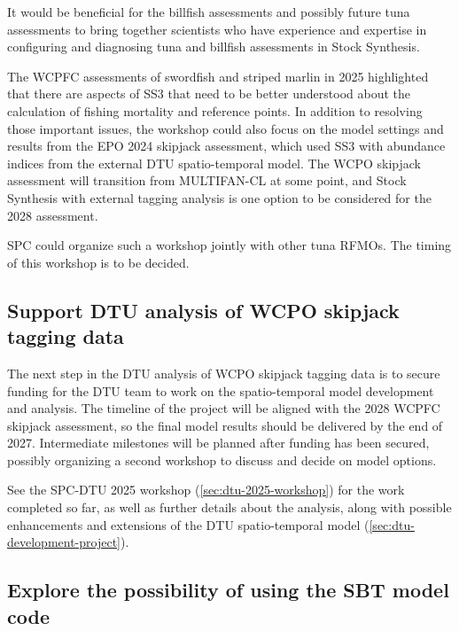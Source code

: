 \documentclass{SCreport}
\begin{document}
It would be beneficial for the billfish assessments and possibly future tuna
assessments to bring together scientists who have experience and expertise in
configuring and diagnosing tuna and billfish assessments in Stock Synthesis.

The WCPFC assessments of swordfish and striped marlin in 2025 highlighted that
there are aspects of SS3 that need to be better understood about the calculation
of fishing mortality and reference points. In addition to resolving those
important issues, the workshop could also focus on the model settings and
results from the EPO 2024 skipjack assessment, which used SS3 with abundance
indices from the external DTU spatio-temporal model. The WCPO skipjack
assessment will transition from MULTIFAN-CL at some point, and Stock Synthesis
with external tagging analysis is one option to be considered for the 2028
assessment.

SPC could organize such a workshop jointly with other tuna RFMOs. The timing of
this workshop is to be decided.

\vspace{2ex}

\subsection{Support DTU analysis of WCPO skipjack tagging data}
\label{sec:dtu-support-tagging}

The next step in the DTU analysis of WCPO skipjack tagging data is to secure
funding for the DTU team to work on the spatio-temporal model development and
analysis. The timeline of the project will be aligned with the 2028 WCPFC
skipjack assessment, so the final model results should be delivered by the end
of 2027. Intermediate milestones will be planned after funding has been secured,
possibly organizing a second workshop to discuss and decide on model options.

See the SPC-DTU 2025 workshop (\autoref{sec:dtu-2025-workshop}) for the work
completed so far, as well as further details about the analysis, along with
possible enhancements and extensions of the DTU spatio-temporal model
(\autoref{sec:dtu-development-project}).

\vspace{2ex}

\subsection{Explore the possibility of using the SBT model code}
\label{sec:sbt-model-code}
\end{document}
